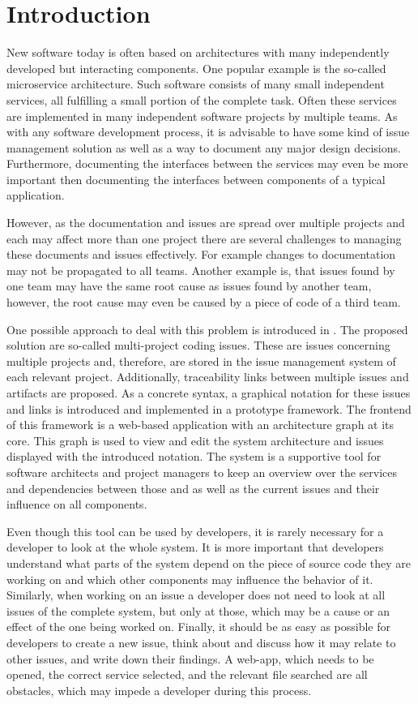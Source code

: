 
\chapter{Introduction}
\label{chap:ch1}
New software today is often based on architectures with many independently developed but interacting components.
One popular example is the so-called microservice architecture.
Such software consists of many small independent services, all fulfilling a small portion of the complete task.
Often these services are implemented in many independent software projects by multiple teams.
As with any software development process, it is advisable to have some kind of issue management solution 
as well as a way to document any major design decisions.
Furthermore, documenting the interfaces between the services may even be more important 
then documenting the interfaces between components of a typical application.

However, as the documentation and issues are spread over multiple projects
and each may affect more than one project there are several challenges to managing these documents and issues effectively.
For example changes to documentation may not be propagated to all teams. 
Another example is, that issues found by one team may have the same root cause as issues found by another team, 
however, the root cause may even be caused by a piece of code of a third team.

One possible approach to deal with this problem is introduced in \cite{Speth2019}.
The proposed solution are so-called multi-project coding issues. 
These are issues concerning multiple projects and, therefore, are stored in the issue management system of each relevant project. 
Additionally, traceability links between multiple issues and artifacts are proposed.
As a concrete syntax, a graphical notation for these issues and links is introduced and implemented in a prototype framework. 
The frontend of this framework is a web-based application with an architecture graph at its core.
This graph is used to view and edit the system architecture and issues displayed with the introduced notation. 
The system is a supportive tool for software architects and project managers to keep an overview over the services
and dependencies between those and as well as the current issues and their influence on all components.

Even though this tool can be used by developers, it is rarely necessary for a developer to look at the whole system. 
It is more important that developers understand what parts of the system depend on the piece of source code they are working on and which other components may influence the behavior of it. 
Similarly, when working on an issue a developer does not need to look at all issues of the complete system, but only at those, which may be a cause or an effect of the one being worked on. 
Finally, it should be as easy as possible for developers to create a new issue, think about and discuss how it may relate to other issues, and write down their findings.
A web-app,  which needs to be opened, the correct service selected, and the relevant file searched are all obstacles, which may impede a developer during this process. 

